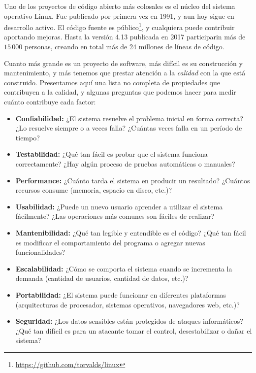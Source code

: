 \begin{sabias_que}
Uno de los proyectos de código abierto más colosales es el núcleo
del sistema operativo Linux. Fue publicado por primera vez en 1991, y aun
hoy sigue en desarrollo activo. El código fuente es
público\footnote{\url{https://github.com/torvalds/linux}}, y cualquiera
puede contribuir aportando mejoras. Hasta la versión 4.13 publicada en 2017
participarin más de $15\,000$ personas, creando en total más de 24 millones de
líneas de código.
\end{sabias_que}

Cuanto más grande es un proyecto de software, más difícil es su construcción y
mantenimiento, y más tenemos que prestar atención a la \emph{calidad} con la
que está construido. Presentamos aquí una lista no completa de propiedades que
contribuyen a la calidad, y algunas preguntas que podemos hacer para medir
cuánto contribuye cada factor:

\begin{itemize}
        \item {\bf Confiabilidad:} ¿El sistema resuelve el problema inicial en
            forma correcta? ¿Lo resuelve siempre o a veces falla? ¿Cuántas
            veces falla en un período de tiempo?
        \item {\bf Testabilidad:} ¿Qué tan fácil es probar que el sistema
            funciona correctamente? ¿Hay algún proceso de pruebas automáticas o
            manuales?
        \item {\bf Performance:} ¿Cuánto tarda el sistema en producir un
            resultado? ¿Cuántos recursos consume (memoria, espacio en disco,
            etc.)?
        \item {\bf Usabilidad:} ¿Puede un nuevo usuario aprender a utilizar el
            sistema fácilmente? ¿Las operaciones más comunes son fáciles de
            realizar?
        \item {\bf Mantenibilidad:} ¿Qué tan legible y entendible es el código?
            ¿Qué tan fácil es modificar el comportamiento del programa o
            agregar nuevas funcionalidades?
        \item {\bf Escalabilidad:} ¿Cómo se comporta el sistema cuando
            se incrementa la demanda (cantidad de usuarios, cantidad de datos,
            etc.)?
        \item {\bf Portabilidad:} ¿El sistema puede funcionar en diferentes
            plataformas (arquitecturas de procesador, sistemas operativos,
            navegadores web, etc.)?
        \item {\bf Seguridad:} ¿Los datos sensibles están protegidos de ataques
            informáticos? ¿Qué tan difícil es para un atacante tomar el control,
            desestabilizar o dañar el sistema?
\end{itemize}

